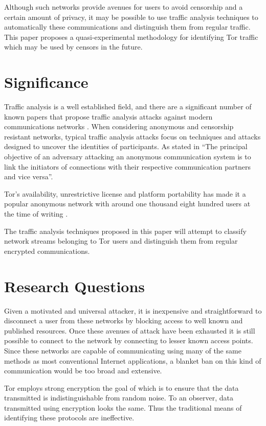 \documentclass{ecuthesis}
\begin{document}
Although such networks provide avenues for users to avoid censorship and a certain amount of privacy, it may be possible to use traffic analysis techniques to automatically these communications and distinguish them from regular traffic. This paper proposes a quasi-experimental methodology for identifying Tor traffic which may be used by censors in the future.

\section{Significance}

Traffic analysis is a well established field, and there are a significant number of known papers that propose traffic analysis attacks against modern communications networks \citep{Zhang:2009p1188}. When considering anonymous and censorship resistant networks, typical traffic analysis attacks focus on techniques and attacks designed to uncover the identities of participants. As stated in \citet{Murdoch:2005p325} “The principal objective of an adversary attacking an anonymous communication system is to link the initiators of connections with their respective communication partners and vice versa”.

Tor’s availability, unrestrictive license and platform portability has made it a popular anonymous network with around one thousand eight hundred users at the time of writing \citep{website:tor-anonymity-online}.

The traffic analysis techniques proposed in this paper will attempt to classify network streams belonging to Tor users and distinguish them from regular encrypted communications.

\section{Research Questions}

Given a motivated and universal attacker, it is inexpensive and straightforward to disconnect a user from these networks by blocking access to well known and published resources. Once these avenues of attack have been exhausted it is still possible to connect to the network by connecting to lesser known access points. Since these networks are capable of communicating using many of the same methods as most conventional Internet applications, a blanket ban on this kind of communication would be too broad and extensive.

Tor employs strong encryption the goal of which is to ensure that the data transmitted is indistinguishable from random noise. To an observer, data transmitted using encryption looks the same. Thus the traditional means of identifying these protocols are ineffective.
\end{document}

